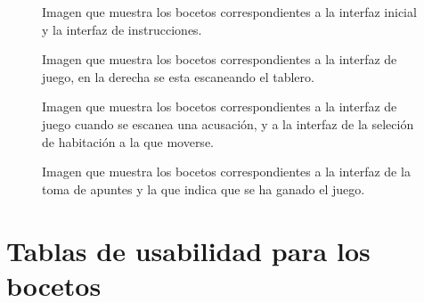 \begin{figure}[h]
  \centering
  \qquad
  \caption{Imagen que muestra los bocetos correspondientes a la interfaz inicial y la interfaz de instrucciones.}
\end{figure}

\begin{figure}[h]
  \qquad
  \caption{Imagen que muestra los bocetos correspondientes a la interfaz de juego, en la derecha se esta escaneando el tablero.}
\end{figure}

\begin{figure}[h]
  \centering
  \qquad
  \caption{Imagen que muestra los bocetos correspondientes a la interfaz de juego cuando se escanea una acusación, y a la interfaz de la seleción de habitación a la que moverse.}
\end{figure}

\begin{figure}[h]
  \centering
  \qquad
  \caption{Imagen que muestra los bocetos correspondientes a la interfaz de la toma de apuntes y la que indica que se ha ganado el juego.}
\end{figure}

\FloatBarrier


\section{Tablas de usabilidad para los bocetos} \label{tablas-usabilidad-bocetos}

